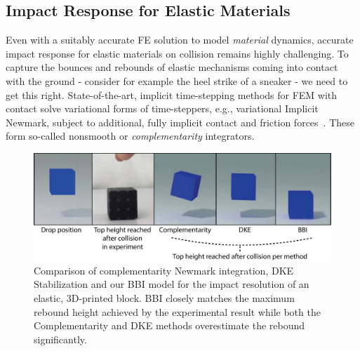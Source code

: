 \subsection{Impact Response for Elastic Materials}
Even with a suitably accurate FE solution to model \emph{material} dynamics, accurate impact response for elastic materials on collision remains highly challenging.  To capture the bounces and rebounds of elastic mechanisms coming into contact with the ground - consider for example the heel strike of a sneaker - we need to get this right. State-of-the-art, implicit time-stepping methods for FEM with contact solve variational forms of time-steppers, e.g., variational Implicit Newmark, subject to additional, fully implicit contact and friction forces~\cite{Kane:1999kr,Pandolfi:2002ik}. 
These form so-called nonsmooth or \emph{complementarity} integrators. 

\begin{figure}
	\centering
	\includegraphics[width=0.8\columnwidth]{figs/Figure_2_BBI}	
	\caption{Comparison of complementarity Newmark integration, DKE Stabilization and our BBI model for the impact resolution of an elastic, 3D-printed block. BBI closely matches the maximum rebound height achieved by the experimental result while both the Complementarity and DKE methods overestimate the rebound significantly.}
	\label{fig:BBI_block_compare}
\end{figure}

